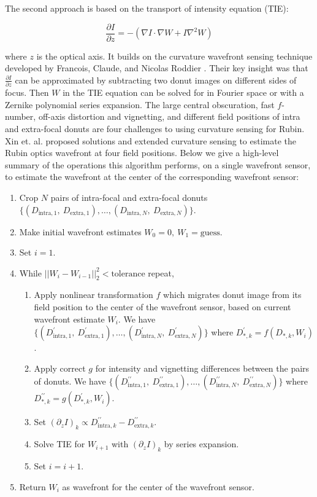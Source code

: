 The second approach is based on the transport of intensity equation (TIE):

\begin{equation}\label{eqn:tie}
\frac{\partial I}{\partial z} = -(\nabla I \cdot \nabla W + I \nabla^2 W)
\end{equation}

\noindent where $z$ is the optical axis. It builds on the curvature wavefront sensing technique developed by Francois, Claude, and Nicolas Roddier \cite{curvaturesensing}. Their key insight was that $\frac{\partial I}{\partial z}$ can be approximated by subtracting two donut images on different sides of focus. Then $W$ in the TIE equation can be solved for in Fourier space or with a Zernike polynomial series expansion. The large central obscuration, fast $f$-number, off-axis distortion and vignetting, and different field positions of intra and extra-focal donuts are four challenges to using curvature sensing for Rubin. Xin et. al. \cite{2015Xin} proposed solutions and extended curvature sensing to estimate the Rubin optics wavefront at four field positions. Below we give a high-level summary of the operations this algorithm performs, on a single wavefront sensor, to estimate the wavefront at the center of the corresponding wavefront sensor:

\begin{enumerate}
\item Crop $N$ pairs of intra-focal and extra-focal donuts \\$\{(D_{\text{intra},1},\ D_{\text{extra},1}), \dots, (D_{\text{intra},N},\ D_{\text{extra},N})\}$.
\item Make initial wavefront estimates $W_0 = 0,\ W_1 = \text{guess}$.
\item Set $i = 1$.
\item While $||W_i - W_{i-1}||_2^2 < \text{tolerance}$ repeat,
\begin{enumerate}
\item Apply nonlinear transformation $f$ which migrates donut image from its field position to the center of the wavefront sensor, based on current wavefront estimate $W_i$. We have $\{(D_{\text{intra},1}^\prime,\ D_{\text{extra},1}^\prime), \dots, (D_{\text{intra},N}^\prime,\ D_{\text{extra},N}^\prime)\}$ where $D_{*,k}^\prime = f(D_{*,k}, W_i)$.
\item Apply correct $g$ for intensity and vignetting differences between the pairs of donuts. We have $\{(D_{\text{intra},1}^{\prime\prime},\ D_{\text{extra},1}^{\prime\prime}), \dots, (D_{\text{intra},N}^{\prime\prime},\ D_{\text{extra},N}^{\prime\prime})\}$ where $D_{*,k}^{\prime\prime} = g(D_{*,k}^\prime, W_i)$.
\item Set $(\partial_z I)_k \propto D_{\text{intra},k}^{\prime\prime} - D_{\text{extra},k}^{\prime\prime}$.
\item Solve TIE for $W_{i+1}$ with $(\partial_z I)_k$ by series expansion.
\item Set $i = i + 1$.
\end{enumerate}
\item Return $W_i$ as wavefront for the center of the wavefront sensor.
\end{enumerate}

